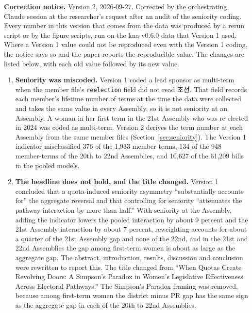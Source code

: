 \documentclass[11pt]{article}
\begin{document}
{\small
{}
\noindent\textbf{Correction notice.} Version 2, 2026-09-27. Corrected by the orchestrating Claude session at the researcher's request after an audit of the seniority coding. Every number in this version that comes from the data was produced by a rerun script or by the figure scripts, run on the kna v0.6.0 data that Version 1 used. Where a Version 1 value could not be reproduced even with the Version 1 coding, the notice says so and the paper reports the reproducible value. The changes are listed below, with each old value followed by its new value.

\begin{enumerate}
\setlength{\itemsep}{1pt}
\item \textbf{Seniority was miscoded.} Version 1 coded a lead sponsor as multi-term when the member file's \texttt{reelection} field did not read 초선. That field records each member's lifetime number of terms at the time the data were collected and takes the same value in every Assembly, so it is not seniority at an Assembly. A woman in her first term in the 21st Assembly who was re-elected in 2024 was coded as multi-term. Version 2 derives the term number at each Assembly from the same member files (Section~\ref{sec:seniority}). The Version 1 indicator misclassified 376 of the 1,933 member-terms, 134 of the 948 member-terms of the 20th to 22nd Assemblies, and 10,627 of the 61,209 bills in the pooled models.
\item \textbf{The headline does not hold, and the title changed.} Version 1 concluded that a quota-induced seniority asymmetry ``substantially accounts for'' the aggregate reversal and that controlling for seniority ``attenuates the pathway interaction by more than half.'' With seniority at the Assembly, adding the indicator lowers the pooled interaction by about 9 percent and the 21st Assembly interaction by about 7 percent, reweighting accounts for about a quarter of the 21st Assembly gap and none of the 22nd, and in the 21st and 22nd Assemblies the gap among first-term women is about as large as the aggregate gap. The abstract, introduction, results, discussion and conclusion were rewritten to report this. The title changed from ``When Quotas Create Revolving Doors: A Simpson's Paradox in Women's Legislative Effectiveness Across Electoral Pathways.'' The Simpson's Paradox framing was removed, because among first-term women the district minus PR gap has the same sign as the aggregate gap in each of the 20th to 22nd Assemblies.

\end{enumerate}}
\end{document}
